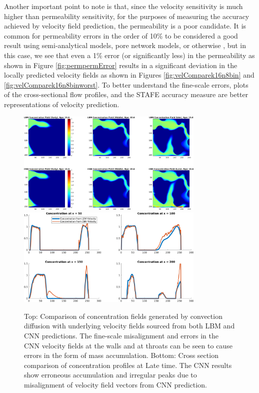\documentclass{article}
\begin{document}
Another important point to note is that, since the velocity sensitivity is much higher than permeability sensitivity, for the purposes of measuring the accuracy achieved by velocity field prediction, the permeability is a poor candidate. It is common for permeability errors in the order of 10\% to be considered a good result using semi-analytical models, pore network models, or otherwise \cite{pfvs}, but in this case, we see that even a 1\% error (or significantly less) in the permeability as shown in Figure \ref{fig:permpermError} results in a significant deviation in the locally predicted velocity fields as shown in Figures \ref{fig:velComparek16n8bin} and \ref{fig:velComparek16n8binworst}. To better understand the fine-scale errors, plots of the cross-sectional flow profiles, and the STAFE accuracy measure are better representations of velocity prediction. 

\begin{figure}[htp!]
  \centering
    \includegraphics[width=0.8\textwidth]{figures/velConcCNNs365-6.png}
  \vspace{5mm}
      \includegraphics[width=0.8\textwidth]{figures/velConcCNNplots.png}
    \caption{Top: Comparison of concentration fields generated by convection diffusion with underlying velocity fields sourced from both LBM and CNN predictions. The fine-scale misalignment and errors in the CNN velocity fields at the walls and at throats can be seen to cause errors in the form of mass accumulation. Bottom: Cross section comparison of concentration profiles at Late time. The CNN results show erroneous accumulation and irregular peaks due to misalignment of velocity field vectors from CNN prediction.}
    \label{fig:velCompareConc}
\end{figure}
\end{document}
